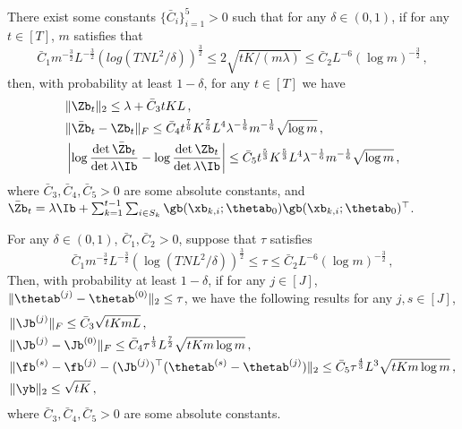 \documentclass{article}
\theoremstyle{plain}
\begin{document}
\begin{lemma} \label{extended lemma:lemma B.3 in NeuralUCB}
There exist some constants $\{ \bar{C}_i \}_{i=1}^5 > 0$ such that for any $\delta \in (0,1)$, if for any $t \in [T]$, $m$ satisfies that
%
    \begin{equation*}
        \bar{C}_1 m^{-\frac{3}{2}} L^{-\frac{3}{2}} \left( log(T N L^2/\delta) \right)^{\frac{3}{2}} 
        \le 2 \sqrt{tK/(m \lambda)} \le
        \bar{C}_2 L^{-6} (\log m )^{-\frac{3}{2}} \, ,
    \end{equation*}
%
then, with probability at least $1 - \delta$, for any $t \in [T]$ we have
%
    \begin{align*}
        & \| \Zb_t \|_2 \le \lambda + \bar{C}_3 t K L \, ,
        \\
        & \| \bar{\Zb}_t - \Zb_t \|_F \le \bar{C}_4 t^{\frac{7}{6}} K^{\frac{7}{6}} L^4 \lambda^{-\frac{1}{6}} m^{-\frac{1}{6}}\sqrt{\log m} \, ,
        \\
        & \left| \log \frac{\det \bar{\Zb}_t}{\det \lambda \Ib} - \log \frac{\det \Zb_t}{\det \lambda \Ib} \right|
            \le \bar{C}_5 t^{\frac{5}{3}} K^{\frac{5}{3}} L^4 \lambda^{-\frac{1}{6}} m^{-\frac{1}{6}} \sqrt{\log m} \, ,
    \end{align*}
%
where $\bar{C}_3, \bar{C}_4, \bar{C}_5 >0$ are some absolute constants, and $\bar{\Zb}_t = \lambda \Ib + \sum_{k=1}^{t-1} \sum_{i \in S_k} \gb(\xb_{k,i}; \thetab_0) \gb(\xb_{k,i}; \thetab_0)^\top$.

    
\end{lemma}

\begin{lemma} \label{aux lemma:lemma C.2 in NeuralUCB}
For any $\delta \in (0,1)$, $ \bar{C}_1, \bar{C}_2 > 0$, suppose that $\tau$ satisfies
%
    \begin{equation*}
        \bar{C}_1 m^{-\frac{3}{2}} L^{-\frac{3}{2}} \left( \log(T N L^2 / \delta) \right)^{\frac{3}{2}}
        \le \tau \le
        \bar{C}_2 L^{-6} (\log m)^{-\frac{3}{2}} \, ,
    \end{equation*}
%
Then, with probability at least $1 - \delta$, if for any $j \in [J]$, $\| \thetab^{(j)} - \thetab^{(0)} \|_2 \le \tau$, we have the following results for any $j, s \in [J]$,
%
    \begin{align*}
        & \| \Jb^{(j)} \|_F \le \bar{C}_3 \sqrt{t K m L} \, ,
        \\
        & \| \Jb^{(j)} - \Jb^{(0)} \|_F \le \bar{C}_4 \tau^{\frac{1}{3}} L^{\frac{7}{2}} \sqrt{t K m \log m}  \, ,
        \\
        & \| \fb^{(s)} - \fb^{(j)} - ( \Jb^{(j)})^\top ( \thetab^{(s)} - \thetab^{(j)} ) \|_2 \le \bar{C}_5 \tau^{\frac{4}{3}} L^3 \sqrt{t K m \log m} \, ,
        \\
        & \| \yb \|_2 \le \sqrt{tK} \, ,
    \end{align*}
%
where $\bar{C}_3, \bar{C}_4, \bar{C}_5 >0$ are some absolute constants.
\end{lemma}
\end{document}

